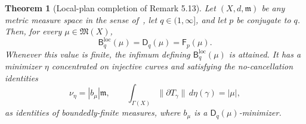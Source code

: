 \documentclass[11pt]{article}
\newtheorem{theorem}{Theorem}
\newcommand{\X}{X}
\newcommand{\m}{\mathfrak m}
\begin{document}
\begin{theorem}[Local-plan completion of Remark 5.13]\label{thm:main}
Let $(\X,d,\m)$ be any metric measure space in the sense of~\cite{AIKP}, let
$q\in(1,\infty]$, and let $p$ be conjugate to $q$.  Then, for every
$\mu\in\mathfrak M(\X)$,
\[
 \boxed{\quad
 \mathsf B_q^{\mathrm{loc}}(\mu)
 =\mathsf D_q(\mu)
 =\mathsf F_p(\mu).
 \quad}
 \tag{5.1}\label{eq:main}
\]
Whenever this value is finite, the infimum defining
$\mathsf B_q^{\mathrm{loc}}(\mu)$ is attained.  It has a minimizer $\eta$
concentrated on injective curves and satisfying the no-cancellation identities
\[
 \nu_\eta=|b_\mu|\m,
 \qquad
 \int_{\Gamma(\X)}\|\partial T_\gamma\|\,d\eta(\gamma)=|\mu|,
 \tag{5.2}\label{eq:exact}
\]
as identities of boundedly-finite measures, where $b_\mu$ is a
$\mathsf D_q(\mu)$-minimizer.
\end{theorem}
\end{document}
